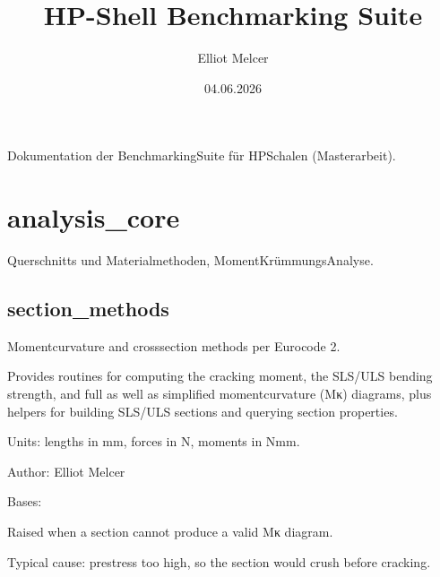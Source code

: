 \documentclass[a4paper,11pt,german]{sphinxmanual}
\title{HP-Shell Benchmarking Suite}
\date{04.06.2026}
\author{Elliot Melcer}
\begin{document}
\pagestyle{empty}
\sphinxmaketitle
\pagestyle{plain}
\sphinxtableofcontents
\pagestyle{normal}
\label{\detokenize{index::doc}}


\sphinxAtStartPar
Dokumentation der Benchmarking\sphinxhyphen{}Suite für HP\sphinxhyphen{}Schalen (Masterarbeit).

\sphinxstepscope


\chapter{analysis\_core}
\label{\detokenize{api/analysis_core:analysis-core}}\label{\detokenize{api/analysis_core::doc}}
\sphinxAtStartPar
Querschnitts\sphinxhyphen{} und Materialmethoden, Moment\sphinxhyphen{}Krümmungs\sphinxhyphen{}Analyse.


\section{section\_methods}
\label{\detokenize{api/analysis_core:module-core.analysis_core.section_methods}}\label{\detokenize{api/analysis_core:section-methods}}
\sphinxAtStartPar
Moment\sphinxhyphen{}curvature and cross\sphinxhyphen{}section methods per Eurocode 2.

\sphinxAtStartPar
Provides routines for computing the cracking moment, the SLS/ULS bending
strength, and full as well as simplified moment\sphinxhyphen{}curvature (M\sphinxhyphen{}κ) diagrams,
plus helpers for building SLS/ULS sections and querying section properties.

\sphinxAtStartPar
Units: lengths in mm, forces in N, moments in Nmm.

\sphinxAtStartPar
Author: Elliot Melcer

\begin{fulllineitems}
\label{\detokenize{api/analysis_core:core.analysis_core.section_methods.InvalidSectionForMKError}}
\pysigstartsignatures
\pysigline
{}
\pysigstopsignatures
\sphinxAtStartPar
Bases: 

\sphinxAtStartPar
Raised when a section cannot produce a valid M\sphinxhyphen{}κ diagram.

\sphinxAtStartPar
Typical cause: prestress too high, so the section would crush before
cracking.

\end{fulllineitems}
\end{document}
